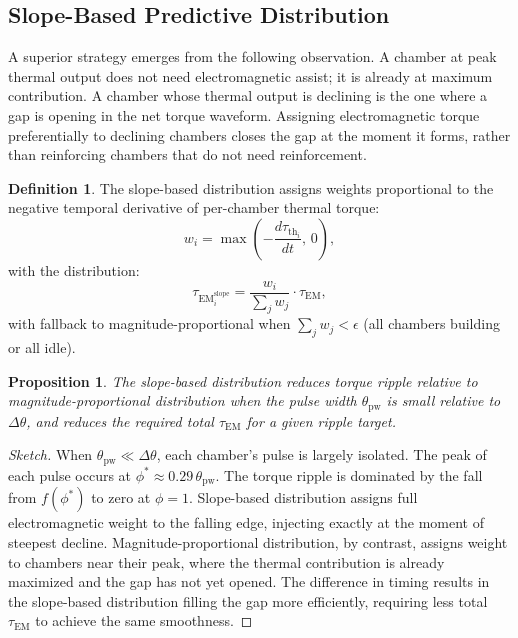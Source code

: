 \documentclass[11pt, a4paper]{article}
\theoremstyle{plain}
\newtheorem{proposition}[theorem]{Proposition}
\theoremstyle{definition}
\newtheorem{definition}[theorem]{Definition}
\newcommand{\tauEM}{\tau_{\mathrm{EM}}}
\newcommand{\tauth}{\tau_{\mathrm{th}}}
\begin{document}
\subsection{Slope-Based Predictive Distribution}

A superior strategy emerges from the following observation. A chamber at peak thermal output does not need electromagnetic assist; it is already at maximum contribution. A chamber whose thermal output is declining is the one where a gap is opening in the net torque waveform. Assigning electromagnetic torque preferentially to declining chambers closes the gap at the moment it forms, rather than reinforcing chambers that do not need reinforcement.

\begin{definition}
The slope-based distribution assigns weights proportional to the negative temporal derivative of per-chamber thermal torque:
\begin{equation}
  w_i = \max\!\left(-\frac{d\tauth_i}{dt},\, 0\right),
\end{equation}
with the distribution:
\begin{equation}
  \tauEM_i^{\mathrm{slope}} = \frac{w_i}{\sum_j w_j} \cdot \tauEM,
  \label{eq:slope_dist}
\end{equation}
with fallback to magnitude-proportional when $\sum_j w_j < \epsilon$ (all chambers building or all idle).
\end{definition}

\begin{proposition}
The slope-based distribution reduces torque ripple relative to magnitude-proportional distribution when the pulse width $\theta_{\mathrm{pw}}$ is small relative to $\Delta\theta$, and reduces the required total $\tauEM$ for a given ripple target.
\end{proposition}

\begin{proof}[Sketch]
When $\theta_{\mathrm{pw}} \ll \Delta\theta$, each chamber's pulse is largely isolated. The peak of each pulse occurs at $\phi^* \approx 0.29\, \theta_{\mathrm{pw}}$. The torque ripple is dominated by the fall from $f(\phi^*)$ to zero at $\phi = 1$. Slope-based distribution assigns full electromagnetic weight to the falling edge, injecting exactly at the moment of steepest decline. Magnitude-proportional distribution, by contrast, assigns weight to chambers near their peak, where the thermal contribution is already maximized and the gap has not yet opened. The difference in timing results in the slope-based distribution filling the gap more efficiently, requiring less total $\tauEM$ to achieve the same smoothness.
\end{proof}
\end{document}
